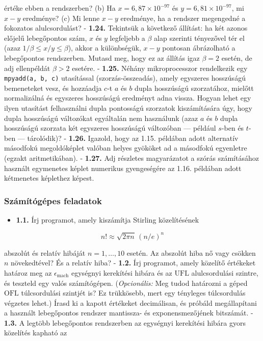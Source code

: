 \documentclass[
  magyar,
  11pt]{article}
\providecommand{\tightlist}{%
  \setlength{\itemsep}{0pt}\setlength{\parskip}{0pt}}
\begin{document}
értéke ebben a rendszerben? (b) Ha \(x = 6{,}87 \times 10^{-97}\) és
\(y = 6{,}81 \times 10^{-97}\), mi \(x - y\) eredménye? (c) Mi lenne
\(x - y\) eredménye, ha a rendszer megengedné a fokozatos
alulcsordulást? - \textbf{1.24.} Tekintsük a következő állítást: ha két
azonos előjelű lebegőpontos szám, \(x\) és \(y\) legfeljebb a \(\beta\)
alap szerinti tényezővel tér el (azaz \(1/\beta \le x/y \le \beta\)),
akkor a különbségük, \(x - y\) pontosan ábrázolható a lebegőpontos
rendszerben. Mutasd meg, hogy ez az állítás igaz \(\beta = 2\) esetén,
de adj ellenpéldát \(\beta > 2\) esetére. - \textbf{1.25.} Néhány
mikroprocesszor rendelkezik egy \texttt{mpyadd(a,\ b,\ c)} utasítással
(szorzás-összeadás), amely egyszeres hosszúságú bemeneteket vesz, és
hozzáadja \(c\)-t \(a\) és \(b\) dupla hosszúságú szorzatához, mielőtt
normalizálná és egyszeres hosszúságú eredményt adna vissza. Hogyan lehet
egy ilyen utasítást felhasználni dupla pontosságú szorzatok
kiszámítására úgy, hogy dupla hosszúságú változókat egyáltalán nem
használunk (azaz \(a\) és \(b\) dupla hosszúságú szorzata két egyszeres
hosszúságú változóban --- például \(s\)-ben és \(t\)-ben --- tárolódik)?
- \textbf{1.26.} Igazold, hogy az 1.15. példában adott alternatív
másodfokú megoldóképlet valóban helyes gyököket ad a másodfokú
egyenletre (egzakt aritmetikában). - \textbf{1.27.} Adj részletes
magyarázatot a szórás számításához használt egymenetes képlet numerikus
gyengeségére az 1.16. példában adott kétmenetes képlethez képest.

\subsubsection{Számítógépes
feladatok}\label{szuxe1muxedtuxf3guxe9pes-feladatok}

\begin{itemize}
\tightlist
\item
  \textbf{1.1.} Írj programot, amely kiszámítja Stirling közelítésének
\end{itemize}

\[n! \approx \sqrt{2\pi n}\,\left(n/e\right)^n\]

abszolút és relatív hibáját \(n = 1, \dots, 10\) esetén. Az abszolút
hiba nő vagy csökken \(n\) növekedtével? És a relatív hiba? -
\textbf{1.2.} Írj programot, amely közelítő értékeket határoz meg az
\(\epsilon_{\text{mach}}\) egységnyi kerekítési hibára és az
\(\text{UFL}\) alulcsordulási szintre, és teszteld egy valós
számítógépen. (\emph{Opcionális:} Meg tudod határozni a géped
\(\text{OFL}\) túlcsordulási szintjét is? Ez trükkösebb, mert egy
tényleges túlcsordulás végzetes lehet.) Írasd ki a kapott értékeket
decimálisan, és próbáld megállapítani a használt lebegőpontos rendszer
mantissza- és exponensmezőjének bitszámát. - \textbf{1.3.} A legtöbb
lebegőpontos rendszerben az egységnyi kerekítési hibára gyors közelítés
kapható az
\end{document}
